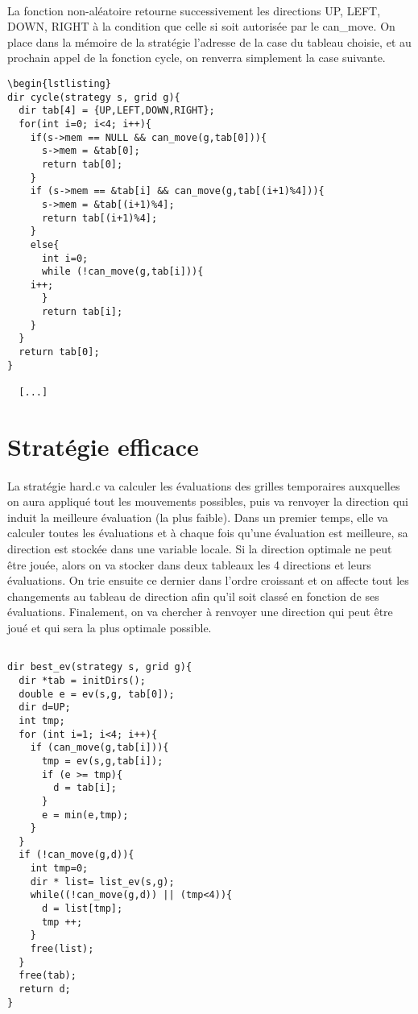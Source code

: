 \documentclass{report}
\begin{document}
\paragraph{}
La fonction non-aléatoire retourne successivement les directions UP, LEFT, DOWN, RIGHT à la condition que celle si soit autorisée par le can{\_}move. On place dans la mémoire de la stratégie l'adresse de la case du tableau choisie, et au prochain appel de la fonction cycle, on renverra simplement la case suivante.
\begin{lstlisting}
\begin{lstlisting}
dir cycle(strategy s, grid g){
  dir tab[4] = {UP,LEFT,DOWN,RIGHT};
  for(int i=0; i<4; i++){
    if(s->mem == NULL && can_move(g,tab[0])){
      s->mem = &tab[0];
      return tab[0];
    }
    if (s->mem == &tab[i] && can_move(g,tab[(i+1)%4])){
      s->mem = &tab[(i+1)%4];
      return tab[(i+1)%4];
    }
    else{
      int i=0;
      while (!can_move(g,tab[i])){
	i++;
      }
      return tab[i];
    }
  }
  return tab[0];
}

  [...]
\end{lstlisting}





\section*{Stratégie efficace}
\paragraph{}La stratégie hard.c va calculer les évaluations des grilles temporaires auxquelles on aura appliqué tout les mouvements possibles, puis va renvoyer la direction qui induit la meilleure évaluation (la plus faible).
Dans un premier temps, elle va calculer toutes les évaluations et à chaque fois qu'une évaluation est meilleure, sa direction est stockée dans une variable locale. Si la direction optimale ne peut être jouée, alors on va stocker dans deux tableaux les 4 directions et leurs évaluations. On trie ensuite ce dernier dans l'ordre croissant et on affecte tout les changements au tableau de direction afin qu'il soit classé en fonction de ses évaluations. Finalement, on va chercher à renvoyer une direction qui peut être joué et qui sera la plus optimale possible.

\begin{lstlisting}

dir best_ev(strategy s, grid g){
  dir *tab = initDirs();
  double e = ev(s,g, tab[0]);
  dir d=UP;
  int tmp;
  for (int i=1; i<4; i++){
    if (can_move(g,tab[i])){
      tmp = ev(s,g,tab[i]);
      if (e >= tmp){
    	d = tab[i];
      }
      e = min(e,tmp);
    }
  }
  if (!can_move(g,d)){
    int tmp=0;
    dir * list= list_ev(s,g);
    while((!can_move(g,d)) || (tmp<4)){
      d = list[tmp];
      tmp ++;
    }
    free(list);
  }
  free(tab);
  return d;
}
\end{lstlisting}
\end{document}
